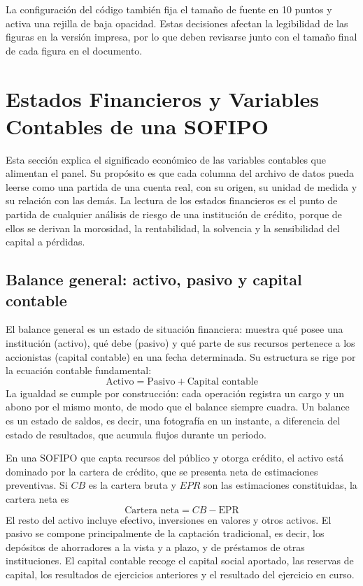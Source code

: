 La configuración del código también fija el tamaño de fuente en 10 puntos y activa una rejilla de baja opacidad. Estas decisiones afectan la legibilidad de las figuras en la versión impresa, por lo que deben revisarse junto con el tamaño final de cada figura en el documento.

\section{Estados Financieros y Variables Contables de una SOFIPO}\label{sec:estados_financieros}

Esta sección explica el significado económico de las variables contables que alimentan el panel. Su propósito es que cada columna del archivo de datos pueda leerse como una partida de una cuenta real, con su origen, su unidad de medida y su relación con las demás. La lectura de los estados financieros es el punto de partida de cualquier análisis de riesgo de una institución de crédito, porque de ellos se derivan la morosidad, la rentabilidad, la solvencia y la sensibilidad del capital a pérdidas.

\subsection{Balance general: activo, pasivo y capital contable}
El balance general es un estado de situación financiera: muestra qué posee una institución (activo), qué debe (pasivo) y qué parte de sus recursos pertenece a los accionistas (capital contable) en una fecha determinada. Su estructura se rige por la ecuación contable fundamental:
\begin{equation}
\text{Activo} = \text{Pasivo} + \text{Capital contable}
\label{eq:balance}
\end{equation}
La igualdad se cumple por construcción: cada operación registra un cargo y un abono por el mismo monto, de modo que el balance siempre cuadra. Un balance es un estado de saldos, es decir, una fotografía en un instante, a diferencia del estado de resultados, que acumula flujos durante un periodo.

En una SOFIPO que capta recursos del público y otorga crédito, el activo está dominado por la cartera de crédito, que se presenta neta de estimaciones preventivas. Si $CB$ es la cartera bruta y $EPR$ son las estimaciones constituidas, la cartera neta es
\begin{equation}
\text{Cartera neta} = CB - \text{EPR}
\label{eq:cartera_neta}
\end{equation}
El resto del activo incluye efectivo, inversiones en valores y otros activos. El pasivo se compone principalmente de la captación tradicional, es decir, los depósitos de ahorradores a la vista y a plazo, y de préstamos de otras instituciones. El capital contable recoge el capital social aportado, las reservas de capital, los resultados de ejercicios anteriores y el resultado del ejercicio en curso.

